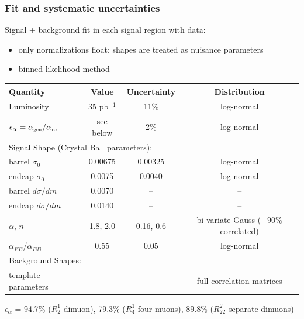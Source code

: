 \documentclass[compress]{beamer}
\begin{document}
\begin{frame}
\frametitle{Fit and systematic uncertainties}

Signal + background fit in each signal region with data:
\begin{itemize}
\item only normalizations float; shapes are treated as nuisance parameters
\item binned likelihood method
\end{itemize}

\vspace{-0.25 cm}
\begin{center}
\scriptsize
\renewcommand{\arraystretch}{1.2}
\begin{tabular}{| l | c| c|c|}
\hline\hline 
Quantity & Value & Uncertainty & Distribution \\\hline
Luminosity & 35 pb$^{-1}$ & 11\% & log-normal \\
$\epsilon_\alpha=\alpha_{\mbox{\tiny gen}}/\alpha_{\mbox{\tiny rec}}$ & see below & 2\% & log-normal \\
\hline
\multicolumn{4}{|l|}{Signal Shape (Crystal Ball parameters):} \\\hline
barrel $\sigma_0$ & 0.00675 & 0.00325 & log-normal \\
endcap $\sigma_0$ & 0.0075 & 0.0040 & log-normal \\
barrel $d\sigma/dm$  & 0.0070 & -- & --\\
endcap $d\sigma/dm$  & 0.0140 & -- & --\\
$\alpha$, $n$ & 1.8, 2.0 & 0.16, 0.6 & bi-variate Gauss ($-90$\% correlated) \\
\hline
$\alpha_{EB}/\alpha_{BB}$ & 0.55 & 0.05 & log-normal \\
\hline
\multicolumn{4}{|l|}{Background Shapes:} \\\hline
template parameters & - & - & full correlation matrices \\
\hline\hline 
\end{tabular}
\end{center}

\vspace{-0.25 cm}
\scriptsize $\epsilon_\alpha$ = 94.7\% ($R^1_2$ dimuon), 79.3\% ($R^1_4$ four muons), 89.8\% ($R^2_{22}$ separate dimuons)
\end{frame}
\end{document}
